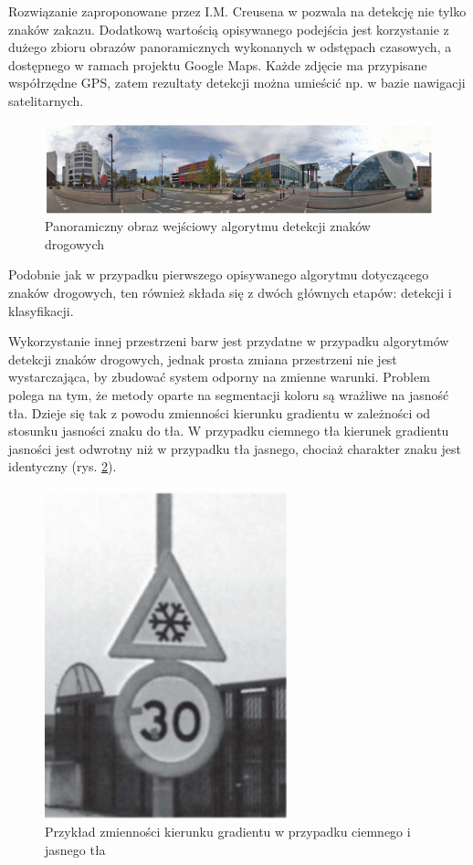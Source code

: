 Rozwiązanie zaproponowane przez I.M. Creusena w \cite{T7} pozwala na detekcję nie tylko znaków zakazu. 
Dodatkową wartością opisywanego podejścia jest korzystanie z dużego zbioru obrazów panoramicznych wykonanych w odstępach czasowych, a dostępnego w ramach projektu Google Maps. 
Każde zdjęcie ma  przypisane współrzędne GPS, zatem rezultaty detekcji można umieścić np. w bazie nawigacji satelitarnych.

\begin{figure}
  \centering
  \includegraphics[width=13cm]{img/sign_detection2_input.png}
  \caption{Panoramiczny obraz wejściowy algorytmu detekcji znaków drogowych\cite{T7}}
  \label{fig:sign_detection2_input}
\end{figure}

Podobnie jak w przypadku pierwszego opisywanego algorytmu dotyczącego znaków drogowych, ten również składa się z dwóch głównych etapów: detekcji i klasyfikacji.

Wykorzystanie innej przestrzeni barw jest przydatne w przypadku algorytmów detekcji znaków drogowych, jednak prosta zmiana przestrzeni nie jest wystarczająca, by zbudować system odporny na zmienne warunki.
Problem polega na tym, że metody oparte na segmentacji koloru są wrażliwe na jasność tła. 
Dzieje się tak z powodu zmienności kierunku gradientu w zależności od stosunku jasności znaku do tła. 
W przypadku ciemnego tła kierunek gradientu jasności jest odwrotny niż w przypadku tła jasnego, chociaż charakter znaku jest identyczny (rys. \ref{fig:sign_detection2_example}).

\begin{figure}
  \centering
  \includegraphics[width=7cm]{img/sign_detection2_example.png}
  \caption{Przykład zmienności kierunku gradientu w przypadku ciemnego i jasnego tła\cite{T7}}
  \label{fig:sign_detection2_example}
\end{figure}

